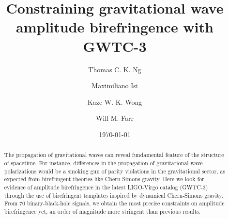 \documentclass[aps,prd,twocolumn,superscriptaddress,preprintnumbers,floatfix,nofootinbib]{revtex4-2}
\begin{document}
\title{Constraining gravitational wave amplitude birefringence with GWTC-3}

\author{Thomas C. K. Ng}

\author{Maximiliano Isi}

\author{Kaze W. K. Wong}

\author{Will M. Farr}

\date{\today}

\begin{abstract}
    The propagation of gravitational waves can reveal fundamental feature of the structure of spacetime.
    For instance, differences in the propagation of gravitational-wave polarizations would be a smoking gun of parity violations in the gravitational sector, as expected from birefringent theories like Chern-Simons gravity.
    Here we look for evidence of amplitude birefringence in the latest LIGO-Virgo catalog (GWTC-3) through the use of birefringent templates inspired by dynamical Chern-Simons gravity.
    From 70 binary-black-hole signals, we obtain the most precise constraints on amplitude birefringence yet, an order of magnitude more stringent than previous results.
\end{abstract}

\maketitle

\begin{acronym}
\end{acronym}
\end{document}
